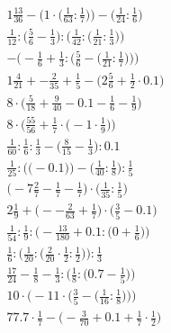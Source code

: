\documentclass[8pt]{article}
\begin{document}
\begin{align}
1\frac{13}{36} - \Big(1 \cdot \big(\frac{1}{63} : \frac{1}{7}\big)\Big) - \Big(\frac{1}{24} : \frac{1}{6}\Big) \\
\frac{1}{12} : \Big(\frac{5}{6} - \frac{1}{3}\Big) : \Big(\frac{1}{42} : \big(\frac{1}{21} : \frac{1}{3}\big)\Big) \\
-\bigg(-\frac{1}{6} + \frac{1}{3} : \Big(\frac{5}{6} - \big(\frac{1}{21} : \frac{1}{7}\big)\Big)\bigg) \\
1\frac{4}{21} + -\frac{2}{35} + \frac{1}{5} - \big(2\frac{5}{6} + \frac{1}{2} \cdot 0.1\big) \\
8 \cdot \big(\frac{5}{18} + \frac{9}{40} - 0.1 - \frac{1}{6} - \frac{1}{9}\big) \\
8 \cdot \Big(\frac{55}{56} + \frac{1}{7} \cdot \big(-1 \cdot \frac{1}{9}\big)\Big) \\
\frac{1}{60} : \frac{1}{6} : \frac{1}{3} - \big(\frac{8}{15} - \frac{1}{3}\big) : 0.1 \\
\frac{1}{25} : \Big(\big(-0.1\big)\Big) - \Big(\frac{1}{40} : \frac{1}{8}\Big) : \frac{1}{5} \\
\big(-7\frac{2}{7} - \frac{1}{7} - \frac{1}{7}\big) \cdot \big(\frac{1}{35} : \frac{1}{5}\big) \\
2\frac{1}{9} + \big(--\frac{2}{63} + \frac{1}{7}\big) \cdot \big(\frac{3}{5} - 0.1\big) \\
\frac{1}{54} : \frac{1}{9} : \Big(-\frac{13}{180} + 0.1 : \big(0 + \frac{1}{6}\big)\Big) \\
\frac{1}{6} : \Big(\frac{1}{20} : \big(\frac{2}{20} \cdot \frac{1}{2} : \frac{1}{2}\big)\Big) : \frac{1}{3} \\
\frac{17}{24} - \frac{1}{8} - \frac{1}{3} : \Big(\frac{1}{8} : \big(0.7 - \frac{1}{5}\big)\Big) \\
10 \cdot \bigg(-11 \cdot \Big(\frac{3}{5} - \big(\frac{1}{16} : \frac{1}{8}\big)\Big)\bigg) \\
77.7 \cdot \frac{1}{7} - \big(-\frac{3}{70} + 0.1 + \frac{1}{7} \cdot \frac{1}{2}\big)
\end{align}
\end{document}
